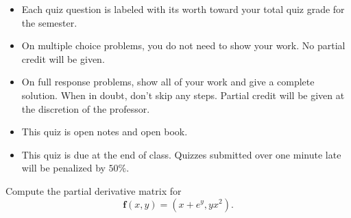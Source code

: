 \documentclass[12pt]{exam}
\newcommand{\vect}[1]{\ensuremath{\mathbf{#1}}}
\newcommand{\<}{(}
\renewcommand{\>}{)}
\begin{document}
\begin{center}
\end{center}
\vspace{0.1in}

\vspace{12pt}

\begin{itemize}
  \item Each quiz question is labeled with its worth toward your total quiz
        grade for the semester.
  \item On multiple choice problems, you do not need to show your work. No
        partial credit will be given.
  \item On full response problems, show all of your work and give a
        complete solution. When in doubt, don't skip any steps. Partial
        credit will be given at the discretion of the professor.
  \item This quiz is open notes and open book.
  \item This quiz is due at the end of class. Quizzes submitted over one minute
        late will be penalized by \(50\%\).
\end{itemize}

\newpage

\begin{questions}

\question[10]
Compute the partial derivative matrix for
\[
  \vect f(x,y) = \<x+e^y,yx^2\>
.\]

\vfill




\end{questions}
\end{document}
